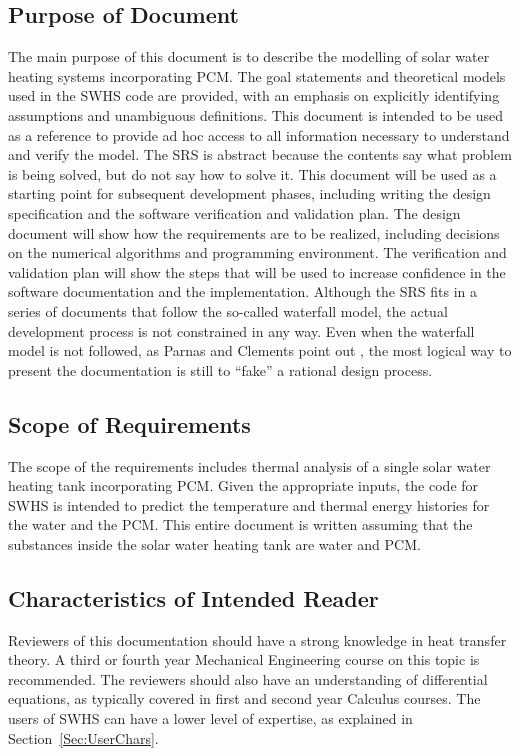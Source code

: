 \documentclass[12pt]{article}
\begin{document}
\subsection{Purpose of Document}
\label{Sec:DocPurpose}
The main purpose of this document is to describe the modelling of solar water heating systems incorporating PCM. The goal statements and theoretical models used in the SWHS code are provided, with an emphasis on explicitly identifying assumptions and unambiguous definitions. This document is intended to be used as a reference to provide ad hoc access to all information necessary to understand and verify the model. The SRS is abstract because the contents say what problem is being solved, but do not say how to solve it.
This document will be used as a starting point for subsequent development phases, including writing the design specification and the software verification and validation plan. The design document will show how the requirements are to be realized, including decisions on the numerical algorithms and programming environment. The verification and validation plan will show the steps that will be used to increase confidence in the software documentation and the implementation. Although the SRS fits in a series of documents that follow the so-called waterfall model, the actual development process is not constrained in any way. Even when the waterfall model is not followed, as Parnas and Clements point out \cite{parnasClements1986}, the most logical way to present the documentation is still to ``fake'' a rational design process.
\subsection{Scope of Requirements}
\label{Sec:ReqsScope}
The scope of the requirements includes thermal analysis of a single solar water heating tank incorporating PCM. Given the appropriate inputs, the code for SWHS is intended to predict the temperature and thermal energy histories for the water and the PCM. This entire document is written assuming that the substances inside the solar water heating tank are water and PCM.
\subsection{Characteristics of Intended Reader}
\label{Sec:ReaderChars}
Reviewers of this documentation should have a strong knowledge in heat transfer theory. A third or fourth year Mechanical Engineering course on this topic is recommended. The reviewers should also have an understanding of differential equations, as typically covered in first and second year Calculus courses. The users of SWHS can have a lower level of expertise, as explained in Section~\ref{Sec:UserChars}.
\end{document}
